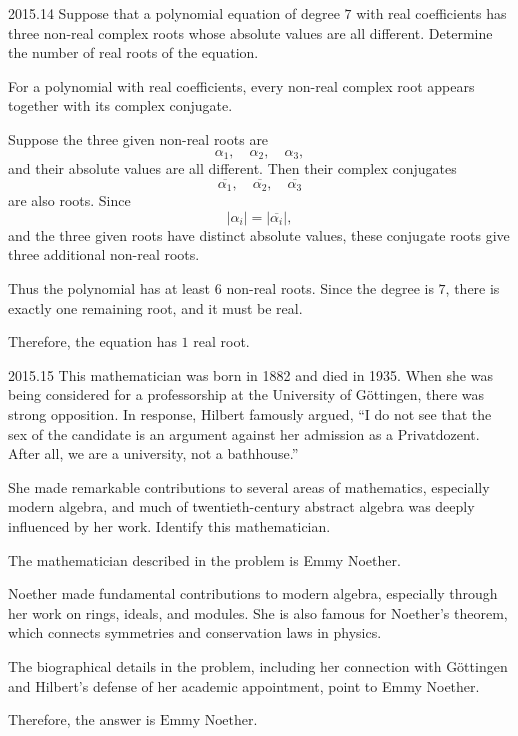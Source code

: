     \begin{pastproblem}{2015.14}
        Suppose that a polynomial equation of degree $7$ with real coefficients has three non-real
        complex roots whose absolute values are all different. Determine the number of real roots of
        the equation.
    \end{pastproblem}

    \begin{solution}
        For a polynomial with real coefficients, every non-real complex root appears together with
        its complex conjugate.

        Suppose the three given non-real roots are
        \[
            \alpha_1,\quad \alpha_2,\quad \alpha_3,
        \]
        and their absolute values are all different. Then their complex conjugates
        \[
            \overline{\alpha_1},\quad
            \overline{\alpha_2},\quad
            \overline{\alpha_3}
        \]
        are also roots. Since
        \[
            |\alpha_i|=|\overline{\alpha_i}|,
        \]
        and the three given roots have distinct absolute values, these conjugate roots give three
        additional non-real roots.

        Thus the polynomial has at least $6$ non-real roots. Since the degree is $7$, there is
        exactly one remaining root, and it must be real.

        Therefore, the equation has $\boxed{1}$ real root.
    \end{solution}

    \begin{pastproblem}{2015.15}
        This mathematician was born in 1882 and died in 1935. When she was being considered for a
        professorship at the University of Göttingen, there was strong opposition. In response,
        Hilbert famously argued, ``I do not see that the sex of the candidate is an argument against
        her admission as a Privatdozent. After all, we are a university, not a bathhouse.''

        She made remarkable contributions to several areas of mathematics, especially modern
        algebra, and much of twentieth-century abstract algebra was deeply influenced by her work.
        Identify this mathematician.
    \end{pastproblem}

    \begin{solution}
        The mathematician described in the problem is Emmy Noether.

        Noether made fundamental contributions to modern algebra, especially through her work on
        rings, ideals, and modules. She is also famous for Noether's theorem, which connects
        symmetries and conservation laws in physics.

        The biographical details in the problem, including her connection with Göttingen and
        Hilbert's defense of her academic appointment, point to Emmy Noether.

        Therefore, the answer is $\boxed{\text{Emmy Noether}}$.
    \end{solution}

